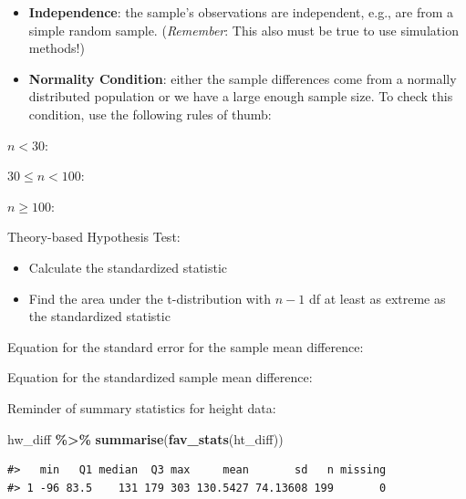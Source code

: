 \documentclass[
]{report}
\newenvironment{Shaded}{\begin{snugshade}}{\end{snugshade}}
\newcommand{\FunctionTok}[1]{\textcolor[rgb]{0.13,0.29,0.53}{\textbf{#1}}}
\newcommand{\NormalTok}[1]{#1}
\newcommand{\SpecialCharTok}[1]{\textcolor[rgb]{0.81,0.36,0.00}{\textbf{#1}}}
\newcommand{\rgi}{\hspace{24pt}}  %
\begin{document}

\begin{itemize}
\item
  \textbf{Independence}: the sample's observations are independent, e.g., are from a simple random sample. (\emph{Remember}: This also must be true to use simulation methods!)
\item
  \textbf{Normality Condition}: either the sample differences come from a normally distributed population or we have a large enough sample size. To check this condition, use the following rules of thumb:
\end{itemize}

\rgi \rgi \(n < 30\):

\vspace{0.2in}

\rgi \rgi \(30 \leq n < 100\):

\vspace{0.2in}

\rgi \rgi \(n \geq 100\):

\vspace{0.2in}

Theory-based Hypothesis Test:

\begin{itemize}
\item
  Calculate the standardized statistic
\item
  Find the area under the t-distribution with \(n - 1\) df at least as extreme as the standardized statistic
\end{itemize}

Equation for the standard error for the sample mean difference:

\vspace{0.5in}

Equation for the standardized sample mean difference:

\vspace{0.5in}

Reminder of summary statistics for height data:

\begin{Shaded}
\begin{Highlighting}[]
\NormalTok{hw\_diff }\SpecialCharTok{\%\textgreater{}\%}
    \FunctionTok{summarise}\NormalTok{(}\FunctionTok{fav\_stats}\NormalTok{(ht\_diff))}
\end{Highlighting}
\end{Shaded}

\begin{verbatim}
#>   min   Q1 median  Q3 max     mean       sd   n missing
#> 1 -96 83.5    131 179 303 130.5427 74.13608 199       0
\end{verbatim}
\end{document}

